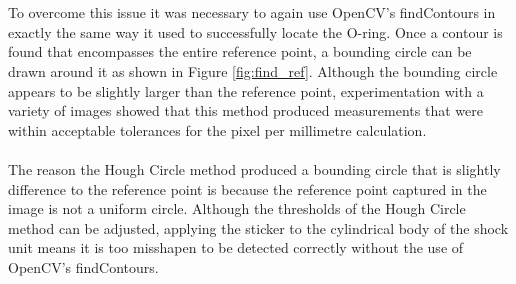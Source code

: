 			\\\\
			To overcome this issue it was necessary to again use OpenCV’s findContours in exactly the same way it used to successfully locate the O-ring. Once a contour is found that encompasses the entire reference point, a bounding circle can be drawn around it as shown in Figure \ref{fig:find_ref}. Although the bounding circle appears to be slightly larger than the reference point, experimentation with a variety of images showed that this method produced measurements that were within acceptable tolerances for the pixel per millimetre calculation.
			\\\\
			The reason the Hough Circle method produced a bounding circle that is slightly difference to the reference point is because the reference point captured in the image is not a uniform circle. Although the thresholds of the Hough Circle method can be adjusted, applying the sticker to the cylindrical body of the shock unit means it is too misshapen to be detected correctly without the use of OpenCV’s findContours.
